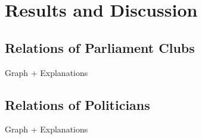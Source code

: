 \chapter{Results and Discussion}
\label{chap:evaluation}

\section{Relations of Parliament Clubs}
\label{sec:relations_clubs}
Graph + Explanations

\section{Relations of Politicians}
Graph + Explanations